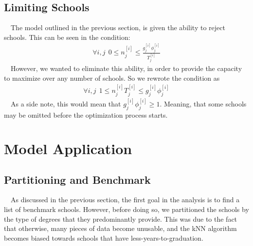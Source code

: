 \documentclass[12pt]{scrartcl}
\begin{document}
	\subsection{Limiting Schools}
		\ \ The model outlined in the previous section, is given the ability to reject schools. This can be seen in the condition:
		\begin{align*}
			\forall i,j \ \ 0\le n_j^{[i]} \le \frac{g_j^{[i]}\phi_j^{[i]}}{T_j^{[i]}}
		\end{align*}
		\ \ However, we wanted to eliminate this ability, in order to provide the capacity to maximize over any number of schools. So we rewrote the condition as 
		\begin{align}
			\forall i,j \ \ 1\le n_j^{[i]}T_j^{[i]} \le g_j^{[i]}\phi_j^{[i]}
		\end{align}	
		\ \ As a side note, this would mean that $g_j^{[i]}\phi_j^{[i]}\ge1$. Meaning, that some schools may be omitted before the optimization process starts.
\section{Model Application} 
	\subsection{Partitioning and Benchmark}
		\ \ As discussed in the previous section, the first goal in the analysis is to find a list of benchmark schools. However, before doing so, we partitioned the schools by the type of degrees that they predominantly provide. This was due to the fact that otherwise, many pieces of data become unusable, and the kNN algorithm becomes biased towards schools that have less-years-to-graduation.\\ 
		\\
		\begin{figure}[H]
		\centering
		\qquad
		\end{figure}
		
\end{document}
